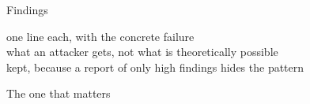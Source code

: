 \begin{frame}{Findings}
  \begin{console}
     one line each, with the concrete failure\\
   what an attacker gets, not what is theoretically possible\\
      kept, because a report of only high findings hides the pattern
  \end{console}
\end{frame}

\begin{frame}{The one that matters}
\end{frame}
